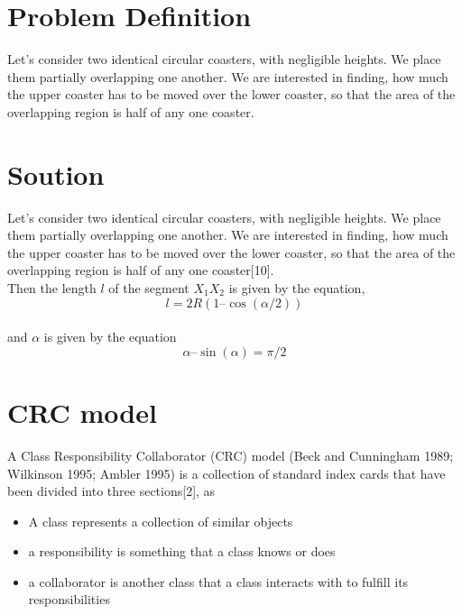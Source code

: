 \documentclass[11pt]{article}
\begin{document}
\section{Problem Definition}
		
		Let’s consider two identical circular coasters, with negligible heights. We place them partially overlapping one another. We are interested in finding, how much the upper coaster has to be moved over the lower coaster, so that the area of the overlapping region is half of any one coaster. 
	
\section{Soution}
	
		Let’s consider two identical circular coasters, with negligible heights. We place them partially overlapping one another. We are interested in finding, how much the upper coaster has to be moved over the lower coaster, so that the area of the overlapping region is half of any one coaster[10].\\
		
		Then the length $l$ of the segment $X_1X_2$ is given by the equation,\\
	
	 	$$l = 2R(1 – \cos(\alpha/2))$$\\ %
	
		and $\alpha$ is given by the equation\\
	
	 	$$\alpha – \sin(\alpha) = \pi/2$$ %

\newpage
\section{CRC model}

		A Class Responsibility Collaborator (CRC) model (Beck and Cunningham 1989; Wilkinson 1995; Ambler 1995) is a collection of standard index cards that have been divided into three sections[2], as 
		
		\begin{itemize}
			\item A class represents a collection of similar objects
			\item a responsibility is something that a class knows or does
			\item a collaborator is another class that a class interacts with to fulfill its responsibilities
		\end{itemize}
	
\end{document}
